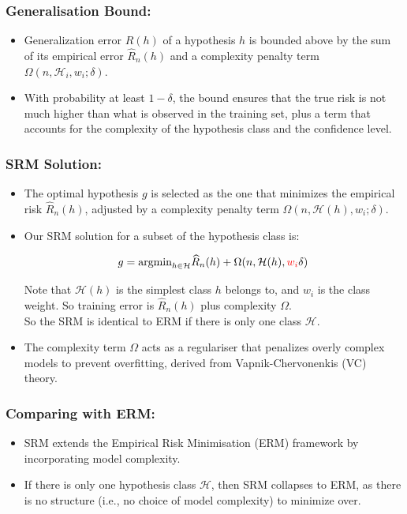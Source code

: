 \subsubsection*{Generalisation Bound:}
\begin{itemize}
    \item Generalization error $R(h)$ of a hypothesis $h$ is bounded above by the sum of its empirical error $\hat{R}_n(h)$ and a complexity penalty term $\Omega(n, \mathcal{H}_i, w_i; \delta)$.
    \item With probability at least $1 - \delta$, the bound ensures that the true risk is not much higher than what is observed in the training set, plus a term that accounts for the complexity of the hypothesis class and the confidence level.
\end{itemize}

\subsubsection*{SRM Solution:}
\begin{itemize}
    \item The optimal hypothesis $g$ is selected as the one that minimizes the empirical risk $\hat{R}_n(h)$, adjusted by a complexity penalty term $\Omega(n, \mathcal{H}(h), w_i; \delta)$.
    \item Our SRM solution for a subset of the hypothesis class is:

    \[g = \text{argmin}_{h \in \mathcal{H}}\widehat{R}_n(h) + \Omega(n, \mathcal{H}(h), {\color{red} w_i}\delta)\]

    Note that $\mathcal{H}(h)$ is the simplest class $h$ belongs to, and $w_i$ is the class weight. So training error is $\widehat{R}_n(h)$ plus complexity $\Omega$.\\

    So the SRM is identical to ERM if there is only one class $\mathcal{H}$.
    \item The complexity term $\Omega$ acts as a regulariser that penalizes overly complex models to prevent overfitting, derived from Vapnik-Chervonenkis (VC) theory.
\end{itemize}

\subsubsection*{Comparing with ERM:}
\begin{itemize}
    \item SRM extends the Empirical Risk Minimisation (ERM) framework by incorporating model complexity.
    \item If there is only one hypothesis class $\mathcal{H}$, then SRM collapses to ERM, as there is no structure (i.e., no choice of model complexity) to minimize over.
\end{itemize}

